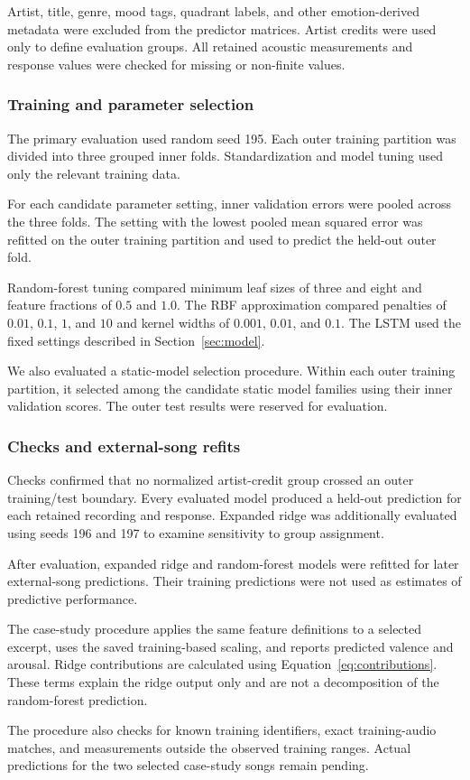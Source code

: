 Artist, title, genre, mood tags, quadrant labels, and other emotion-derived metadata were excluded from the predictor matrices. Artist credits were used only to define evaluation groups. All retained acoustic measurements and response values were checked for missing or non-finite values.

\subsubsection{Training and parameter selection}

The primary evaluation used random seed 195. Each outer training partition was divided into three grouped inner folds. Standardization and model tuning used only the relevant training data.

For each candidate parameter setting, inner validation errors were pooled across the three folds. The setting with the lowest pooled mean squared error was refitted on the outer training partition and used to predict the held-out outer fold.

Random-forest tuning compared minimum leaf sizes of three and eight and feature fractions of $0.5$ and $1.0$. The RBF approximation compared penalties of $0.01$, $0.1$, $1$, and $10$ and kernel widths of $0.001$, $0.01$, and $0.1$. The LSTM used the fixed settings described in Section~\ref{sec:model}.

We also evaluated a static-model selection procedure. Within each outer training partition, it selected among the candidate static model families using their inner validation scores. The outer test results were reserved for evaluation.

\subsubsection{Checks and external-song refits}

Checks confirmed that no normalized artist-credit group crossed an outer training/test boundary. Every evaluated model produced a held-out prediction for each retained recording and response. Expanded ridge was additionally evaluated using seeds 196 and 197 to examine sensitivity to group assignment.

After evaluation, expanded ridge and random-forest models were refitted for later external-song predictions. Their training predictions were not used as estimates of predictive performance.

The case-study procedure applies the same feature definitions to a selected excerpt, uses the saved training-based scaling, and reports predicted valence and arousal. Ridge contributions are calculated using Equation~\eqref{eq:contributions}. These terms explain the ridge output only and are not a decomposition of the random-forest prediction.

The procedure also checks for known training identifiers, exact training-audio matches, and measurements outside the observed training ranges. Actual predictions for the two selected case-study songs remain pending.
